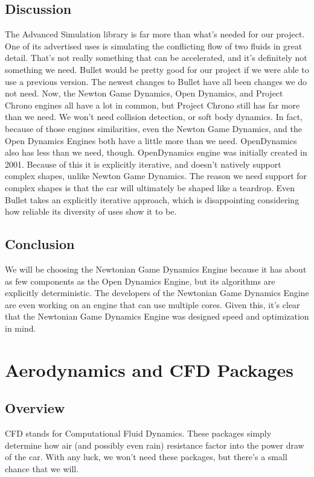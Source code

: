 \documentclass[onecolumn, draftclsnofoot,10pt, compsoc]{IEEEtran}
\begin{document}
\begin{singlespace}
\subsection{Discussion}
The Advanced Simulation library is far more than what's needed for our project.
One of its advertised uses is simulating the conflicting flow of two fluids in great detail.
That's not really something that can be accelerated, and it's definitely not something we need.
Bullet would be pretty good for our project if we were able to use a previous version.
The newest changes to Bullet have all been changes we do not need.
Now, the Newton Game Dynamics, Open Dynamics, and Project Chrono engines all have a lot in common, but Project Chrono still has far more than we need.
We won't need collision detection, or soft body dynamics.
In fact, because of those engines similarities, even the Newton Game Dynamics, and the Open Dynamics Engines both have a little more than we need.
OpenDynamics also has less than we need, though.
OpenDynamics engine was initially created in 2001.
Because of this it is explicitly iterative, and doesn't natively support complex shapes, unlike Newton Game Dynamics.
The reason we need support for complex shapes is that the car will ultimately be shaped like a teardrop.
Even Bullet takes an explicitly iterative approach, which is disappointing considering how reliable its diversity of uses show it to be.

\subsection{Conclusion}
We will be choosing the Newtonian Game Dynamics Engine because it has about as few components as the Open Dynamics Engine, but its algorithms are explicitly deterministic.
The developers of the Newtonian Game Dynamics Engine are even working on an engine that can use multiple cores.
Given this, it's clear that the Newtonian Game Dynamics Engine was designed speed and optimization in mind.


\section{Aerodynamics and CFD Packages}

\subsection{Overview}
CFD stands for Computational Fluid Dynamics.
These packages simply determine how air (and possibly even rain) resistance factor into the power draw of the car.
With any luck, we won't need these packages, but there's a small chance that we will.


\end{singlespace}
\end{document}
